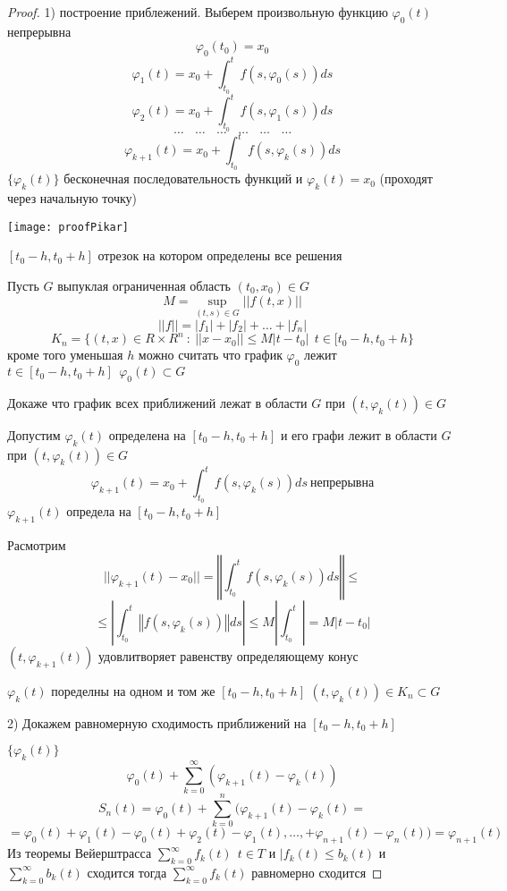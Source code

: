 \begin{proof}
  1) построение приблежений. Выберем произвольную функцию $\varphi_0(t)$
  непрерывна
  $$
  \varphi_0(t_0) = x_0
  $$
  $$
  \varphi_1(t) = x_0 + \int_{t_0}^t f(s, \varphi_0(s))ds
  $$
  $$
  \varphi_2(t) = x_0 + \int_{t_0}^t f(s, \varphi_1(s))ds
  $$
  $$
  \ldots ~~~~ \ldots  ~~~~ \ldots  ~~~~ \ldots  ~~~~ \ldots  ~~~~ \ldots
  $$
  $$
  \varphi_{k+1}(t) = x_0 + \int_{t_0}^t f(s, \varphi_k(s))ds
  $$
  $\{\varphi_k(t)\}$ бесконечная последовательность функций
  и $\varphi_k(t) = x_0$ (проходят через начальную точку)

  \texttt{[image: proofPikar]}

  $[t_0 - h, t_0 + h]$ отрезок на котором определены все решения

  Пусть $G$ выпуклая ограниченная область $(t_0, x_0) \in G$
  $$
  M = \sup_{(t,s) \in G} ||f(t,x)||
  $$
  $$
  ||f|| = |f_1| + |f_2| + \ldots + |f_n|
  $$
  $$
  K_n = \{(t,x) \in R \times R^n ~:~ ||x - x_0|| \le M|t-t_0| ~~
  t \in [t_0 - h, t_0 + h\}
  $$
  кроме того уменьшая $h$ можно считать что график $\varphi_0$ лежит
  $t \in [t_0 - h, t_0 + h] ~~ \varphi_0(t) \subset G$

  Докаже что график всех приближений лежат в области $G$ при $(t, \varphi_k(t))
  \in G$

  Допустим $\varphi_k(t)$ определена на $[t_0 - h, t_0 + h]$ и его графи лежит
  в области $G$ при $(t, \varphi_k(t)) \in G$
  $$
  \varphi_{k+1}(t) = x_0 + \int_{t_0}^t f(s, \varphi_k(s))ds ~
  \text{непрерывна}
  $$
  $\varphi_{k+1}(t)$ определа на $[t_0 - h, t_0 + h]$

  Расмотрим
  $$
  ||\varphi_{k+1}(t) - x_0|| = \left\Vert \int_{t_0}^t f(s, \varphi_k(s))ds
  \right\Vert \le
  $$
  $$
  \le \left| \int_{t_0}^t \left\Vert f(s, \varphi_k(s))\right\Vert ds \right|
  \le M\left| \int_{t_0}^t \right| = M|t-t_0|
  $$
  $(t, \varphi_{k+1}(t))$ удовлитворяет равенству определяющему конус

  $\varphi_k(t)$ поределны на одном и том же $[t_0 - h, t_0 + h]$ $(t,
  \varphi_k(t)) \in K_n \subset G$

  2) Докажем равномерную сходимость приближений на $[t_0 - h, t_0 + h]$

  $\{\varphi_k(t)\}$
  $$
  \varphi_0(t) + \sum_{k=0}^{\infty}(\varphi_{k+1}(t) - \varphi_k(t))
  $$
  $$
  S_n(t) = \varphi_0(t) + \sum_{k=0}^n (\varphi_{k+1}(t) - \varphi_k(t) =
  $$
  $$
  = \varphi_0(t) + \varphi_1(t) - \varphi_0(t) + \varphi_2(t) - \varphi_1(t),
  \ldots, + \varphi_{n+1}(t) - \varphi_n(t)) = \varphi_{n+1}(t)
  $$
  Из теоремы Вейерштрасса $\sum_{k=0}^{\infty} f_k(t) ~~ t \in T$ и
  $|f_k(t) \le b_k(t)$ и $\sum_{k=0}^{\infty} b_k(t)$ сходится тогда
  $\sum_{k=0}^{\infty} f_k(t)$ равномерно сходится


\end{proof}
